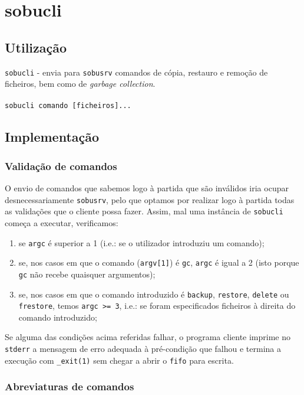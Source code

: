 \documentclass[a4paper,12pt,titlepage,draft,portuguese]{article}
\begin{document}
\section{sobucli}

\subsection{Utilização}

\texttt{sobucli} - envia para \texttt{sobusrv} comandos de cópia, restauro e remoção de ficheiros, bem como de \emph{garbage collection}.
\\\\\texttt{sobucli comando [ficheiros]...}

\subsection{Implementação}

\subsubsection{Validação de comandos}

O envio de comandos que sabemos logo à partida que são inválidos iria ocupar desnecessariamente \texttt{sobusrv}, pelo que optamos por realizar logo à partida todas as validações que o cliente possa fazer. Assim, mal uma instância de \texttt{sobucli} começa a executar, verificamos:

	\begin{enumerate}
		\item se \texttt{argc} é superior a 1 (i.e.: se o utilizador introduziu um comando);
		\item se, nos casos em que o comando (\texttt{argv[1]}) é \texttt{gc}, \texttt{argc} é igual a 2 (isto porque \texttt{gc} não recebe quaisquer argumentos);
		\item se, nos casos em que o comando introduzido é \texttt{backup}, \texttt{restore}, \texttt{delete} ou \texttt{frestore}, temos \texttt{argc >= 3}, i.e.: se foram especificados ficheiros à direita do comando introduzido;
	\end{enumerate}
Se alguma das condições acima referidas falhar, o programa cliente imprime no \texttt{stderr} a mensagem de erro adequada à pré-condição que falhou e termina a execução com \texttt{\_exit(1)} sem chegar a abrir o \texttt{fifo} para escrita.

\subsubsection{Abreviaturas de comandos} \label{Abreviaturas de comandos}
\end{document}
